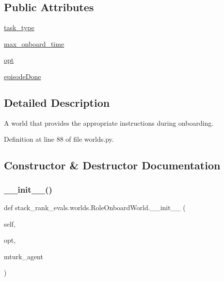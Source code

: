 \subsection*{Public Attributes}
\begin{DoxyCompactItemize}
\item 
\hyperlink{classstack__rank__evals_1_1worlds_1_1RoleOnboardWorld_af8109c2ced237355a055ad67e7436a65}{task\+\_\+type}
\item 
\hyperlink{classstack__rank__evals_1_1worlds_1_1RoleOnboardWorld_a66d9e43741be6eee3262e5ffc47fb147}{max\+\_\+onboard\+\_\+time}
\item 
\hyperlink{classstack__rank__evals_1_1worlds_1_1RoleOnboardWorld_a986c8464db53b9d32da815609b44392d}{opt}
\item 
\hyperlink{classstack__rank__evals_1_1worlds_1_1RoleOnboardWorld_a80faeeeacacbf4babca6b7a66d6716bd}{episode\+Done}
\end{DoxyCompactItemize}


\subsection{Detailed Description}
\begin{DoxyVerb}A world that provides the appropriate instructions during onboarding.
\end{DoxyVerb}
 

Definition at line 88 of file worlds.\+py.



\subsection{Constructor \& Destructor Documentation}
\mbox{\label{classstack__rank__evals_1_1worlds_1_1RoleOnboardWorld_a93c85daae3056c33bc77b6159ce43b57}} 
\subsubsection{\texorpdfstring{\+\_\+\+\_\+init\+\_\+\+\_\+()}{\_\_init\_\_()}\hspace{0.1cm}{\footnotesize\ttfamily [1/2]}}
{\footnotesize\ttfamily def stack\+\_\+rank\+\_\+evals.\+worlds.\+Role\+Onboard\+World.\+\_\+\+\_\+init\+\_\+\+\_\+ (\begin{DoxyParamCaption}\item[{}]{self,  }\item[{}]{opt,  }\item[{}]{mturk\+\_\+agent }\end{DoxyParamCaption})}



